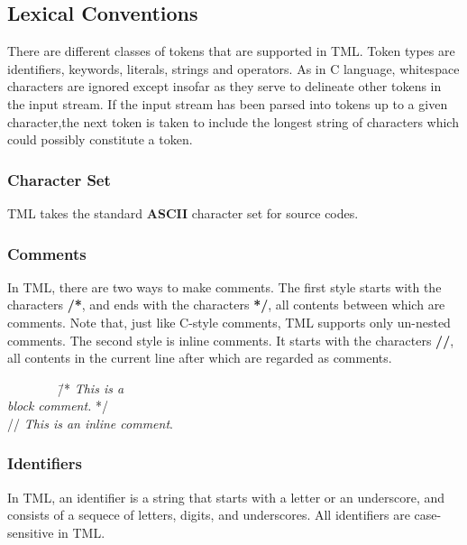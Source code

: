 \documentclass[12pt,psfig,a4]{article}
\begin{document}
\subsection{Lexical Conventions} \label{lexCon}
There are different classes of tokens that are supported in TML. Token types are identifiers, keywords, literals, strings and operators. As in C language, whitespace characters are ignored except insofar as they serve to delineate other tokens in the input stream. If the input stream has been parsed into tokens up to a given character,the next token is taken to include the longest string of characters which could possibly constitute a token.


\subsubsection{Character Set}
TML takes the standard \textbf{ASCII} character set for source codes.

\subsubsection{Comments}
In TML, there are two ways to make comments. The first style starts with the characters \textbf{/*}, and ends with the characters \textbf{*/}, all contents between which are comments. Note that, just like C-style comments, TML supports only un-nested comments. The second style is inline comments. It starts with the characters \textbf{//}, all contents in the current line after which are regarded as comments.

\begin{code}
\begin{tabbing}
~~~~~~~~\= /*  \=\textit{This is a} \\
\> \> \textit{block comment.} */\\
\> // \textit{This is an inline comment}.
\end{tabbing}
\end{code}

\subsubsection{Identifiers} \label{lexConId}
In TML, an identifier is a string that starts with a letter or an underscore, and consists of a sequece of letters, digits, and underscores. %
All identifiers are case-sensitive in TML.
\end{document}
